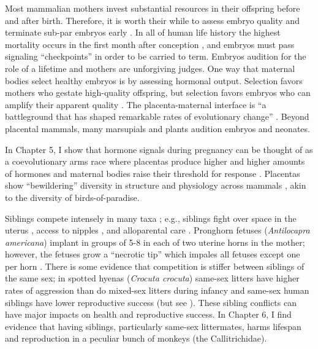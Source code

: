 \vspace{5mm}
\noindent{\textcolor{SchoolColor}{2.1 Embryo Selection}}

Most mammalian mothers invest substantial resources in their offspring before and after birth. Therefore, it is worth their while to assess embryo quality and terminate sub-par embryos early \cite{Buchholz1922, Haig1990}.  In all of human life history the highest mortality occurs in the first month after conception \cite{Roberts1975, Wilcox1988}, and embryos must pass signaling “checkpoints” \cite{Ewington2019} in order to be  carried to term. Embryos audition for the role of a lifetime \cite{Forsdyke2019} and mothers are unforgiving judges.  One way that maternal bodies select healthy embryos is by assessing hormonal output. Selection favors mothers who gestate high-quality offspring, but selection favors embryos who can amplify their apparent quality \cite{Haig2019}. The placenta-maternal interface is “a battleground that has shaped remarkable rates of evolutionary change” \cite{Roberts1996}. Beyond placental mammals, many marsupials \cite{Nelson2003} and plants \cite{Lamont1988, Vaughton1993} audition embryos and neonates.

In Chapter 5, I show that hormone signals during pregnancy can be thought of as a coevolutionary arms race where placentas produce higher and higher amounts of hormones and maternal bodies raise their threshold for response \cite{Haig1996}. Placentas show “bewildering” diversity in structure and physiology across mammals \cite{Roberts1996}, akin to the diversity of birds-of-paradise.

\vspace{5mm}
\noindent{\textcolor{SchoolColor}{2.2 Sibling Competition}}

Siblings compete intensely in many taxa \cite{Hudson2007, Mock1997, Roulin2012, Royle1999}; e.g., siblings fight over space in the uterus \cite{Chapman2013}, access to nipples \cite{Golla1999}, and alloparental care \cite{Neuenschwander2003}. Pronghorn fetuses (\emph{Antilocapra americana}) implant in groups of 5-8 in each of two uterine horns in the mother; however, the fetuses grow a “necrotic tip” which impales all fetuses except one per horn \cite{OGara1969}. There is some evidence that competition is stiffer between siblings of the same sex; in spotted hyenas (\emph{Crocuta crocuta}) same-sex litters have higher rates of aggression than do mixed-sex litters during infancy \cite{Golla1999} and same-sex human siblings have lower reproductive success \cite{Gibson2011, Ji2013, Nitsch2012} (but see \cite{Butikofer2019}). These sibling conflicts can have major impacts on health and reproductive success. In Chapter 6, I find evidence that having siblings, particularly same-sex littermates, harms lifespan and reproduction in a peculiar bunch of monkeys (the Callitrichidae).

